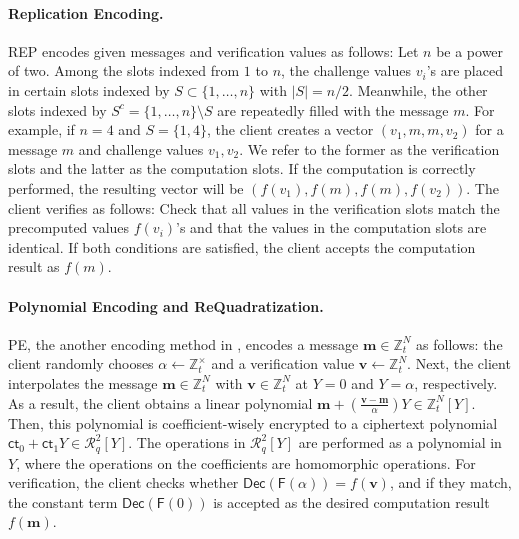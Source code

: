 \documentclass[runningheads]{llncs}
\newcommand{\ct}{\textsf{ct}{}}
\newcommand{\REP}{\textsf{REP}{}}
\newcommand{\PE}{\textsf{PE}{}}
\newcommand{\dec}{\textsf{Dec}}
\begin{document}
        \paragraph{Replication Encoding.} \REP{} encodes given messages and verification values as follows: Let \( n \) be a power of two. Among the slots indexed from \( 1 \) to \( n \), the challenge values \( v_i \)'s are placed in certain slots indexed by \( S \subset \{1, \dots, n\} \) with \( |S| = n/2 \). Meanwhile, the other slots indexed by \( S^c = \{1, \dots, n\} \setminus S \) are repeatedly filled with the message \( m \). For example, if \( n = 4 \) and \( S = \{1, 4\} \), the client creates a vector \( (v_1, m, m, v_2) \) for a message \( m \) and challenge values \( v_1, v_2 \). We refer to the former as the verification slots and the latter as the computation slots. If the computation is correctly performed, the resulting vector will be \( (f(v_1), f(m), f(m), f(v_2)) \). The client verifies as follows: Check that all values in the verification slots match the precomputed values \( f(v_i) \)'s and that the values in the computation slots are identical. If both conditions are satisfied, the client accepts the computation result as \( f(m) \).

        \paragraph{Polynomial Encoding and ReQuadratization.} 
        \PE{}, the another encoding method in \cite{VE}, encodes a message \( \mathbf{m}\in \mathbb{Z}_t^N \) as follows: the client randomly chooses \( \alpha \gets \mathbb{Z}_t^\times \) and a verification value \( \mathbf{v} \gets \mathbb{Z}_t^N \). Next, the client interpolates the message \( \mathbf{m} \in \mathbb{Z}_t^N \) with \( \mathbf{v}\in \mathbb{Z}_t^N \) at \( Y = 0 \) and \( Y = \alpha \), respectively. As a result, the client obtains a linear polynomial
        \( \mathbf{m} + \left(\frac{\mathbf{v} - \mathbf{m}}{\alpha}\right) Y \in \mathbb{Z}_t^N[Y] \). Then, this polynomial is coefficient-wisely encrypted to a ciphertext polynomial \( \ct_0+\ct_1Y \in \mathcal{R}_q^2[Y] \). The operations in \( \mathcal{R}_q^2[Y] \) are performed as a polynomial in \( Y \), where the operations on the coefficients are homomorphic operations. For verification, the client checks whether \( \dec(\mathsf{F}(\alpha)) = f(\mathbf{v}) \), and if they match, the constant term \( \dec(\mathsf{F}(0)) \) is accepted as the desired computation result \( f(\mathbf{m}) \).
\end{document}
